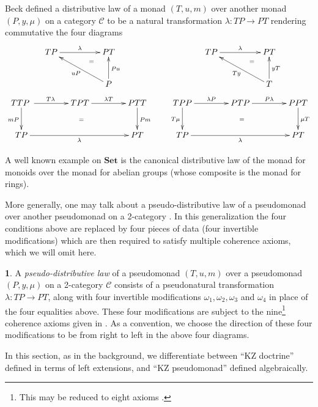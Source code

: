 \documentclass[a4paper,oneside,english]{amsart}
\numberwithin{equation}{section}
\numberwithin{figure}{section}
\theoremstyle{plain}
\theoremstyle{definition}
\newtheorem{defn}[thm]{\protect\definitionname}
\theoremstyle{remark}
\theoremstyle{definition}
\theoremstyle{plain}
\theoremstyle{plain}
\theoremstyle{plain}
\providecommand{\definitionname}{Definition}
\begin{document}
Beck \cite{beckdist} defined a distributive law of a monad $\left(T,u,m\right)$
over another monad $\left(P,y,\mu\right)$ on a category $\mathcal{C}$
to be a natural transformation $\lambda\colon TP\to PT$ rendering
commutative the four diagrams
\[
\xymatrix@=1em{ & TP\ar[rr]^{\lambda} &  & PT &  &  &  & TP\ar[rr]^{\lambda} &  & PT\\
 &  & \;\ar@{}[ru]|-{=} &  &  &  &  &  & \;\ar@{}[ru]|-{=}\\
 &  &  & P\ar[uu]_{Pu}\ar[lluu]^{uP} &  &  &  &  &  & T\ar[uu]_{yT}\ar[lluu]^{Ty}\\
TTP\ar[dd]_{mP}\ar[rr]^{T\lambda}\;\ar@{}[rddrrr]|-{=} &  & TPT\ar[rr]^{\lambda T} &  & PTT\ar[dd]^{Pm} &  & TPP\ar@{}[rddrrr]|-{=}\ar[dd]_{T\mu}\ar[rr]^{\lambda P} &  & PTP\ar[rr]^{P\lambda} &  & PPT\ar[dd]^{\mu T}\\
\\
TP\ar[rrrr]_{\lambda} &  &  &  & PT &  & TP\ar[rrrr]_{\lambda} &  &  &  & PT
}
\]

A well known example on $\mathbf{Set}$ is the canonical distributive
law of the monad for monoids over the monad for abelian groups (whose
composite is the monad for rings). 

More generally, one may talk about a pseudo-distributive law of a
pseudomonad over another pseudomonad on a 2-category \cite{marm1999,kellycoherence,thesisTanaka,cheng2003}.
In this generalization the four conditions above are replaced by four
pieces of data (four invertible modifications) which are then required
to satisfy multiple coherence axioms, which we will omit here.
\begin{defn}
\label{dist} A \emph{pseudo-distributive law }of a pseudomonad $\left(T,u,m\right)$
over a pseudomonad $\left(P,y,\mu\right)$ on a 2-category $\mathscr{C}$
consists of a pseudonatural transformation $\lambda\colon TP\to PT$,
along with four invertible modifications $\omega_{1},\omega_{2},\omega_{3}$
and $\omega_{4}$ in place of the four equalities above. These four
modifications are subject to the nine\footnote{This may be reduced to eight axioms \cite{marm2008}.}
coherence axioms given in \cite[Section 4]{marm1999}. As a convention,
we choose the direction of these four modifications to be from right
to left in the above four diagrams. 
\end{defn}
In this section, as in the background, we differentiate between ``KZ
doctrine'' defined in terms of left extensions, and ``KZ pseudomonad''
defined algebraically. 
\end{document}

